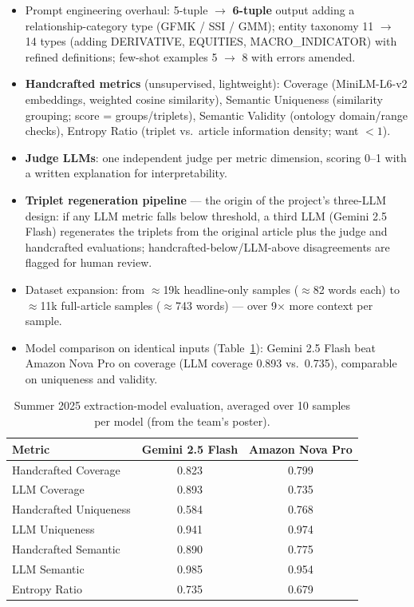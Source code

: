 \documentclass[11pt]{article}
\begin{document}
\begin{itemize}
  \item Prompt engineering overhaul: 5-tuple \(\to\) \textbf{6-tuple} output adding a relationship-category type (GFMK / SSI / GMM); entity taxonomy 11 \(\to\) 14 types (adding DERIVATIVE, EQUITIES, MACRO\_INDICATOR) with refined definitions; few-shot examples 5 \(\to\) 8 with errors amended.
  \item \textbf{Handcrafted metrics} (unsupervised, lightweight): Coverage (MiniLM-L6-v2 embeddings, weighted cosine similarity), Semantic Uniqueness (similarity grouping; score = groups/triplets), Semantic Validity (ontology domain/range checks), Entropy Ratio (triplet vs.\ article information density; want \(<1\)).
  \item \textbf{Judge LLMs}: one independent judge per metric dimension, scoring 0--1 with a written explanation for interpretability.
  \item \textbf{Triplet regeneration pipeline} --- the origin of the project's three-LLM design: if any LLM metric falls below threshold, a third LLM (Gemini 2.5 Flash) regenerates the triplets from the original article plus the judge and handcrafted evaluations; handcrafted-below/LLM-above disagreements are flagged for human review.
  \item Dataset expansion: from \(\approx\)19k headline-only samples (\(\approx\)82 words each) to \(\approx\)11k full-article samples (\(\approx\)743 words) --- over 9\(\times\) more context per sample.
  \item Model comparison on identical inputs (Table~\ref{tab:summer2025eval}): Gemini 2.5 Flash beat Amazon Nova Pro on coverage (LLM coverage 0.893 vs.\ 0.735), comparable on uniqueness and validity.
\end{itemize}

\begin{table}[h]\centering\small
\begin{tabular}{lcc}
\toprule
Metric & Gemini 2.5 Flash & Amazon Nova Pro \\
\midrule
Handcrafted Coverage & 0.823 & 0.799 \\
LLM Coverage & 0.893 & 0.735 \\
Handcrafted Uniqueness & 0.584 & 0.768 \\
LLM Uniqueness & 0.941 & 0.974 \\
Handcrafted Semantic & 0.890 & 0.775 \\
LLM Semantic & 0.985 & 0.954 \\
Entropy Ratio & 0.735 & 0.679 \\
\bottomrule
\end{tabular}
\caption{Summer 2025 extraction-model evaluation, averaged over 10 samples per model (from the team's poster).}
\label{tab:summer2025eval}
\end{table}
\end{document}
